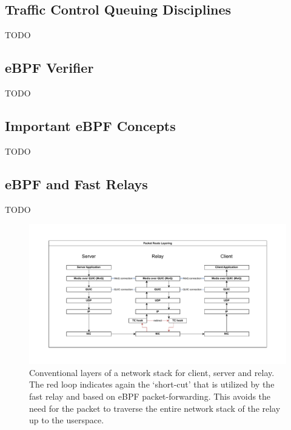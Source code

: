 \subsection{Traffic Control Queuing Disciplines}
TODO

\subsection{eBPF Verifier}
TODO

\subsection{Important eBPF Concepts}
TODO

\subsection{eBPF and Fast Relays}
TODO

\begin{figure}[htbp]
    \centering
    \includegraphics[width=\textwidth]{figures/02_background/route-layering.drawio.pdf}
    \caption{Conventional layers of a network stack for client, server and relay.
    The red loop indicates again the `short-cut' that is utilized by the fast relay and 
    based on eBPF packet-forwarding.
    This avoids the need for the packet to traverse the entire network stack of the relay 
    up to the userspace.}\label{fig:route-layering}
\end{figure}
